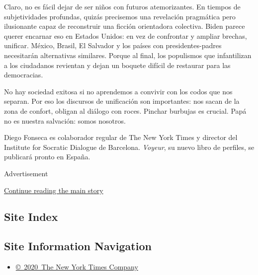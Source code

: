 Claro, no es fácil dejar de ser niños con futuros atemorizantes. En
tiempos de subjetividades profundas, quizás precisemos una revelación
pragmática pero ilusionante capaz de reconstruir una ficción orientadora
colectiva. Biden parece querer encarnar eso en Estados Unidos: en vez de
confrontar y ampliar brechas, unificar. México, Brasil, El Salvador y
los países con presidentes-padres necesitarán alternativas similares.
Porque al final, los populismos que infantilizan a los ciudadanos
revientan y dejan un boquete difícil de restaurar para las democracias.

No hay sociedad exitosa si no aprendemos a convivir con los codos que
nos separan. Por eso los discursos de unificación son importantes: nos
sacan de la zona de confort, obligan al diálogo con roces. Pinchar
burbujas es crucial. Papá no es nuestra salvación: somos nosotros.

Diego Fonseca es colaborador regular de The New York Times y director
del Institute for Socratic Dialogue de Barcelona. \emph{Voyeur}, su
nuevo libro de perfiles, se publicará pronto en España.

Advertisement

\protect\hyperlink{after-bottom}{Continue reading the main story}

\hypertarget{site-index}{%
\subsection{Site Index}\label{site-index}}

\hypertarget{site-information-navigation}{%
\subsection{Site Information
Navigation}\label{site-information-navigation}}

\begin{itemize}
\tightlist
\item
  \href{https://help.nytimes3xbfgragh.onion/hc/en-us/articles/115014792127-Copyright-notice}{©~2020~The
  New York Times Company}
\end{itemize}

